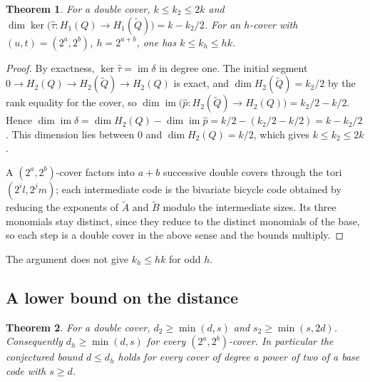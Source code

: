 \documentclass[11pt,a4paper]{article}
\newtheorem{theorem}{Theorem}
\theoremstyle{definition}
\theoremstyle{plain}
\DeclareMathOperator{\im}{im}
\newcommand{\tQ}{\tilde Q}
\newcommand{\hp}{\hat p}
\newcommand{\htau}{\hat\tau}
\begin{document}
\begin{theorem}\label{thm:k}
For a double cover, $k\le k_2\le2k$ and
$\dim\ker\bigl(\htau:H_1(Q)\to H_1(\tQ)\bigr)=k-k_2/2$. For an $h$-cover with
$(u,t)=(2^a,2^b)$, $h=2^{a+b}$, one has $k\le k_h\le hk$.
\end{theorem}

\begin{proof}
By exactness, $\ker\htau=\im\delta$ in degree one. The initial segment
$0\to H_2(Q)\to H_2(\tQ)\to H_2(Q)$ is exact, and $\dim H_2(\tQ)=k_2/2$ by the
rank equality for the cover, so
$\dim\im\bigl(\hp:H_2(\tQ)\to H_2(Q)\bigr)=k_2/2-k/2$. Hence
$\dim\im\delta=\dim H_2(Q)-\dim\im\hp=k/2-(k_2/2-k/2)=k-k_2/2$. This
dimension lies between $0$ and $\dim H_2(Q)=k/2$, which gives
$k\le k_2\le 2k$.

A $(2^a,2^b)$-cover factors into $a+b$ successive double covers through the
tori $(2^il,2^jm)$; each intermediate code is the bivariate bicycle code
obtained by reducing the exponents of $\tilde A$ and $\tilde B$ modulo the
intermediate sizes. Its three monomials stay distinct, since they reduce to
the distinct monomials of the base, so each step is a double cover in the
above sense and the bounds multiply.
\end{proof}

The argument does not give $k_h\le hk$ for odd $h$.

\subsection{A lower bound on the distance}

\begin{theorem}\label{thm:lower}
For a double cover, $d_2\ge\min(d,s)$ and $s_2\ge\min(s,2d)$. Consequently
$d_h\ge\min(d,s)$ for every $(2^a,2^b)$-cover. In particular the conjectured
bound $d\le d_h$ holds for every cover of degree a power of two of a base code
with $s\ge d$.
\end{theorem}
\end{document}

